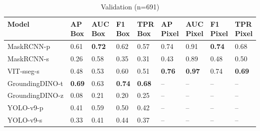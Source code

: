 \begin{table*}[t]
    \begin{subtable}[b]{\textwidth} %
    \caption{Validation (n=691)}
    \centering
        \begin{tabular}{lllllllll}
        \toprule
         Model           & \makecell{AP\\Box}   & \makecell{AUC\\Box}   & \makecell{F1\\Box}   & \makecell{TPR\\Box}   & \makecell{AP\\Pixel}   & \makecell{AUC\\Pixel}   & \makecell{F1\\Pixel}   & \makecell{TPR\\Pixel}   \\
        \midrule
         MaskRCNN-p      & 0.61                 & \textbf{0.72}         & 0.62                 & 0.57                  & 0.74                   & 0.91                    & \textbf{0.74}          & 0.68                    \\
         MaskRCNN-s      & 0.26                 & 0.58                  & 0.35                 & 0.31                  & 0.43                   & 0.89                    & 0.48                   & 0.50                    \\
         VIT-sseg-s      & 0.48                 & 0.53                  & 0.60                 & 0.51                  & \textbf{0.76}          & \textbf{0.97}           & 0.74                   & \textbf{0.69}           \\
         GroundingDINO-t & \textbf{0.69}        & 0.63                  & \textbf{0.74}        & \textbf{0.68}         & --                     & --                      & --                     & --                      \\
         GroundingDINO-z & 0.08                 & 0.21                  & 0.20                 & 0.25                  & --                     & --                      & --                     & --                      \\
         YOLO-v9-p       & 0.41                 & 0.59                  & 0.50                 & 0.42                  & --                     & --                      & --                     & --                      \\
         YOLO-v9-s       & 0.33                 & 0.41                  & 0.44                 & 0.37                  & --                     & --                      & --                     & --                      \\
        \bottomrule
        \end{tabular}
    \end{subtable}


\end{table*}
